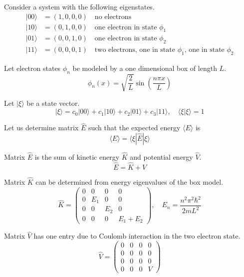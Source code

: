 \documentclass[12pt]{article}
\begin{document}
Consider a system with the following eigenstates.
\begin{align*}
|00\rangle&=(1,0,0,0)\quad\text{no electrons}\\
|10\rangle&=(0,1,0,0)\quad\text{one electron in state $\phi_1$}\\
|01\rangle&=(0,0,1,0)\quad\text{one electron in state $\phi_2$}\\
|11\rangle&=(0,0,0,1)\quad\text{two electrons, one in state $\phi_1$, one in state $\phi_2$}
\end{align*}

Let electron states $\phi_n$ be modeled by a one dimensional box of length $L$.
\begin{equation*}
\phi_n(x)=\sqrt{\frac{2}{L}}\sin\left(\frac{n\pi x}{L}\right)
\end{equation*}

Let $|\xi\rangle$ be a state vector.
\begin{equation*}
|\xi\rangle=c_0|00\rangle+c_1|10\rangle+c_2|01\rangle+c_3|11\rangle,\quad\langle\xi|\xi\rangle=1
\end{equation*}

Let us determine matrix $\hat{E}$ such that the expected
energy $\langle E \rangle$ is
\begin{equation*}
\langle E\rangle=\langle\xi|\hat{E}|\xi\rangle
\end{equation*}

Matrix $\hat{E}$ is the sum of kinetic energy $\hat K$ and potential energy $\hat V$.
\begin{equation*}
\hat{E}=\hat{K}+\hat{V}
\end{equation*}

Matrix $\hat{K}$ can be determined from energy eigenvalues of the box model.
\begin{equation*}
\hat{K}=\begin{pmatrix}
0 & 0 & 0 & 0\\
0 & E_1 & 0 & 0\\
0 & 0 & E_2 & 0\\
0 & 0 & 0 & E_1+E_2
\end{pmatrix},
\quad
E_n=\frac{n^2\pi^2\hbar^2}{2mL^2}
\end{equation*}

Matrix $\hat{V}$ has one entry due to Coulomb interaction in the two electron state.
\begin{equation*}
\hat{V}=
\begin{pmatrix}
0 & 0 & 0 & 0\\
0 & 0 & 0 & 0\\
0 & 0 & 0 & 0\\
0 & 0 & 0 & V
\end{pmatrix}
\end{equation*}
\end{document}
